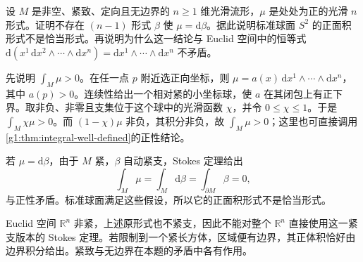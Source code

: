 \begin{exercise}\label{g1:ex:stokes-positive-volume-obstruction}
	设 \(M\) 是非空、紧致、定向且无边界的 \(n\geq1\) 维光滑流形，\(\mu\) 是处处为正的光滑 \(n\) 形式。证明不存在 \((n-1)\) 形式 \(\beta\) 使 \(\mu=\mathrm{d}\beta\)。据此说明标准球面 \(S^2\) 的正面积形式不是恰当形式。再说明为什么这一结论与 Euclid 空间中的恒等式 \(\mathrm{d}(x^1\,\mathrm{d}x^2\wedge\cdots\wedge\mathrm{d}x^n)=\mathrm{d}x^1\wedge\cdots\wedge\mathrm{d}x^n\) 不矛盾。
\end{exercise}
\begin{solution}
	先说明 \(\int_M\mu>0\)。在任一点 \(p\) 附近选正向坐标，则 \(\mu=a(x)\,\mathrm{d}x^1\wedge\cdots\wedge\mathrm{d}x^n\)，其中 \(a(p)>0\)。连续性给出一个相对紧的小坐标球，使 \(a\) 在其闭包上有正下界。取非负、非零且支集位于这个球中的光滑函数 \(\chi\)，并令 \(0\leq\chi\leq1\)。于是 \(\int_M\chi\mu>0\)。而 \((1-\chi)\mu\) 非负，其积分非负，故 \(\int_M\mu>0\)；这里也可直接调用\cref{g1:thm:integral-well-defined}的正性结论。

	若 \(\mu=\mathrm{d}\beta\)，由于 \(M\) 紧，\(\beta\) 自动紧支，Stokes 定理给出
	\[
		\int_M\mu=\int_M\mathrm{d}\beta
		=\int_{\partial M}\beta=0,
	\]
	与正性矛盾。标准球面满足这些假设，所以它的正面积形式不是恰当形式。

	Euclid 空间 \(\mathbb R^n\) 非紧，上述原形式也不紧支，因此不能对整个 \(\mathbb R^n\) 直接使用这一紧支版本的 Stokes 定理。若限制到一个紧长方体，区域便有边界，其正体积恰好由边界积分给出。紧致与无边界在本题的矛盾中各有作用。
\end{solution}

